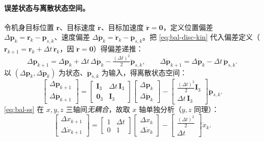 \paragraph{误差状态与离散状态空间。}
令机身目标位置 $\boldsymbol{r}$、目标速度 $\dot{\boldsymbol{r}}$、目标加速度 $\ddot{\boldsymbol{r}}=\boldsymbol{0}$，定义位置偏差 $\Delta\boldsymbol{p}_k=\boldsymbol{r}_k-\boldsymbol{p}_{s,k}$、速度偏差 $\Delta\dot{\boldsymbol{p}}_k=\dot{\boldsymbol{r}}_k-\dot{\boldsymbol{p}}_{s,k}$。把 \cref{eq:bal-disc-kin} 代入偏差定义（$\boldsymbol{r}_{k+1}=\boldsymbol{r}_k+\Delta t\,\dot{\boldsymbol{r}}_k$，因 $\ddot{\boldsymbol{r}}=\boldsymbol{0}$）得偏差递推\cite{unitree2023quadruped}：
\begin{equation}
  \Delta\boldsymbol{p}_{k+1}=\Delta\boldsymbol{p}_k+\Delta t\,\Delta\dot{\boldsymbol{p}}_k-\tfrac{(\Delta t)^2}{2}\ddot{\boldsymbol{p}}_{s,k},
  \qquad
  \Delta\dot{\boldsymbol{p}}_{k+1}=\Delta\dot{\boldsymbol{p}}_k-\Delta t\,\ddot{\boldsymbol{p}}_{s,k}.
  \label{eq:bal-err-dyn}
\end{equation}
以 $(\Delta\boldsymbol{p}_k,\Delta\dot{\boldsymbol{p}}_k)$ 为状态、$\ddot{\boldsymbol{p}}_{s,k}$ 为输入，得离散状态空间\cite{unitree2023quadruped}：
\begin{equation}
  \begin{bmatrix}\Delta\boldsymbol{p}_{k+1}\\[2pt] \Delta\dot{\boldsymbol{p}}_{k+1}\end{bmatrix}
  =\begin{bmatrix}\mathbf{I}_3 & \Delta t\,\mathbf{I}_3\\[2pt] \mathbf{0}_3 & \mathbf{I}_3\end{bmatrix}
  \begin{bmatrix}\Delta\boldsymbol{p}_k\\[2pt] \Delta\dot{\boldsymbol{p}}_k\end{bmatrix}
  -\begin{bmatrix}\tfrac{(\Delta t)^2}{2}\mathbf{I}_3\\[2pt] \Delta t\,\mathbf{I}_3\end{bmatrix}\ddot{\boldsymbol{p}}_{s,k}.
  \label{eq:bal-ss}
\end{equation}
\cref{eq:bal-ss} 在 $x,y,z$ 三轴间\emph{无耦合}，故取 $x$ 轴单独分析（$y,z$ 同理）\cite{unitree2023quadruped}：
\begin{equation}
  \begin{bmatrix}\Delta x_{k+1}\\ \Delta\dot x_{k+1}\end{bmatrix}
  =\begin{bmatrix}1 & \Delta t\\ 0 & 1\end{bmatrix}
  \begin{bmatrix}\Delta x_k\\ \Delta\dot x_k\end{bmatrix}
  -\begin{bmatrix}\tfrac{(\Delta t)^2}{2}\\ \Delta t\end{bmatrix}\ddot x_k.
  \label{eq:bal-ss-x}
\end{equation}

